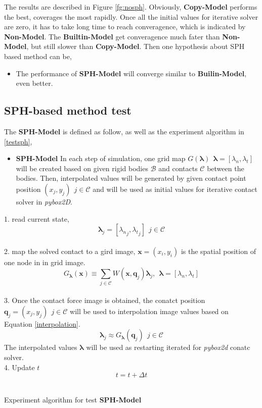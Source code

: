     The results are described in Figure \ref{fg:nosph}. Obviously, \textbf{Copy-Model} performs the best, coverages the most rapidly. Once all the initial values for iterative solver are zero, it has to take long time to reach converagence, which is indicated by \textbf{Non-Model}. The \textbf{Builtin-Model} get converagence much fater than \textbf{Non-Model}, but still slower than \textbf{Copy-Model}. Then one hypothesis about SPH based method can be,
    \begin{itemize}
        \item The performance of \textbf{SPH-Model} will converge similar to \textbf{Builin-Model}, even better.
    \end{itemize}

\subsection{SPH-based method test}
    \label{sphtest}
    The \textbf{SPH-Model} is defined as follow, as well as the experiment algorithm in \ref{testsph},
    \begin{itemize}
         \item \textbf{SPH-Model} In each step of simulation, one grid map $G(\mathbf{\pmb{\lambda}})~~\pmb{\lambda} = [\lambda_n, \lambda_t]$ will be created based on given rigid bodies $\mathcal{B}$ and contacts $\mathcal{C}$ between the bodies. Then, interpolated values will be generated by given contact point position $(x_j, y_j)~~j \in \mathcal{C}$ and will be used as initial values for iterative contact solver in \textit{pybox2D}. 
    \end{itemize}
    \begin{algorithm}[!h]
        {
            1. read current state,
                $$\pmb{\lambda}_{j}=[{\lambda_{n}}_{j}, {\lambda_{t}}_{j}]~~j\in\mathcal{C}$$ \\
            2. map the solved contact to a gird image, $\mathbf{x}=(x_i, y_i)$ is the spatial position of one node in in grid image.
                $$G_{\pmb{\lambda}}(\mathbf{x}) \equiv \sum_{j \in \mathcal{C}} W(\mathbf{x}, \pmb{q}_{j})\pmb{\lambda}_{j},~~\pmb{\lambda}=[\lambda_n, \lambda_t]$$ \\
            3. Once the contact force image is obtained,  the conatct position $\pmb{q}_{j} = (x_{j}, y_{j})~~j\in\mathcal{C}$  will be used to interpolation image values based on Equation \ref{interpolation}.
                $$\pmb{\lambda}_j \approx G_{\pmb{\lambda}}(\pmb{q}_j)~~j\in\mathcal{C}$$ 
            The interpolated values $\pmb{\lambda}$ will be used as restarting iterated for \textit{pybox2d} conatc solver. \\
            4. Update $t$
                $$t = t + \Delta t$$ \\
        }
        \caption{Experiment algorithm for test \textbf{SPH-Model}}
        \label{testsph}
    \end{algorithm}
